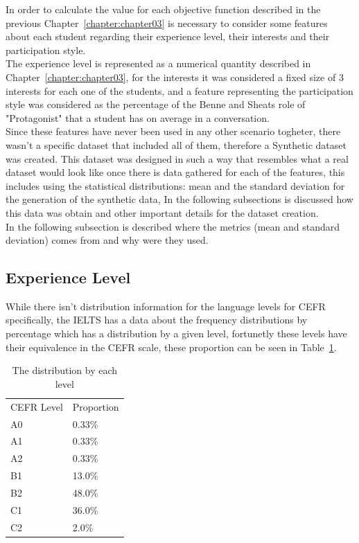 In order to calculate the value for each objective function described in the previous Chapter~\ref{chapter:chapter03} is necessary to consider some features about each student regarding their experience level, their interests and their participation style.\\

The experience level is represented as a numerical quantity described in Chapter~\ref{chapter:chapter03}, for the interests it was considered a fixed size of 3 interests for each one of the students, and a feature representing the participation style was considered as the percentage of the Benne and Sheats role \cite{FunctionalRoles} of "Protagonist" that a student has on average in a conversation.\\

Since these features have never been used in any other scenario togheter, there wasn't a specific dataset that included all of them, therefore a Synthetic dataset was created. This dataset was designed in such a way that resembles what a real dataset would look like once there is data gathered for each of the features, this includes using the statistical distributions: mean and the standard deviation for the generation of the synthetic data, In the following subsections is discussed how this data was obtain and other important details for the dataset creation.\\

In the following subsection is described where the metrics (mean and standard deviation) comes from and why were they used.\\

\subsection{Experience Level} 

While there isn't distribution information for the language levels for CEFR specifically, the IELTS has a data about the frequency distributions by percentage \cite{ielts_demographic_data_2018} which has a distribution by a given level, fortunetly these levels have their equivalence in the CEFR scale, these proportion can be seen in Table~\ref{table:results_levels}.\\

\begin{table}[]
    \begin{tabular}{ll}
    CEFR Level & Proportion \\
    A0         & 0.33\%     \\
    A1         & 0.33\%     \\
    A2         & 0.33\%     \\
    B1         & 13.0\%     \\
    B2         & 48.0\%     \\
    C1         & 36.0\%     \\
    C2         & 2.0\%     
    \end{tabular}
    \caption{The distribution by each level}
    \label{table:results_levels}
\end{table}

